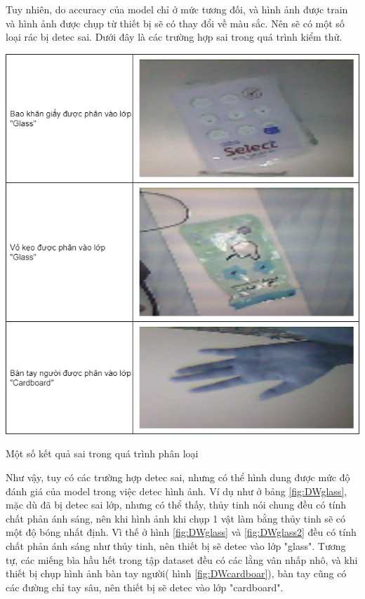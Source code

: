 Tuy nhiên, do accuracy của model chỉ ở mức tương đối, và hình ảnh được train và hình ảnh được chụp từ thiết bị sẽ có thay đổi về màu sắc. Nên sẽ có một số loại rác bị detec sai. Dưới đây là các trường hợp sai trong quá trình kiểm thử.
\begin{table}[H]
    \centering
    \includegraphics[width=\linewidth]{images/Quanh/Trash Failed.png}
    \caption{Một số kết quả sai trong quá trình phân loại}
    \label{fig:DWglass}
\end{table}

Như vậy, tuy có các trường hợp detec sai, nhưng có thể hình dung được mức độ đánh giá của model trong việc detec hình ảnh. Ví dụ như ở bảng \ref{fig:DWglass}, mặc dù đã bị detec sai lớp, nhưng có thể thấy, thủy tinh nói chung đều có tính chất phản ánh sáng, nên khi hình ảnh khi chụp 1 vật làm bằng thủy tinh sẽ có một độ bóng nhất định. Vì thế ở hình \ref{fig:DWglass} và \ref{fig:DWglass2} đều có tính chất phản ánh sáng như thủy tinh, nên thiết bị sẽ detec vào lớp "glass". Tương tự, các miếng bìa hầu hết trong tập dataset đều có các lằng vân nhấp nhô, và khi thiết bị chụp hình ảnh bàn tay người( hình \ref{fig:DWcardboar}), bàn tay cũng có các đường chỉ tay sâu, nên thiết bị sẽ detec vào lớp "cardboard".


